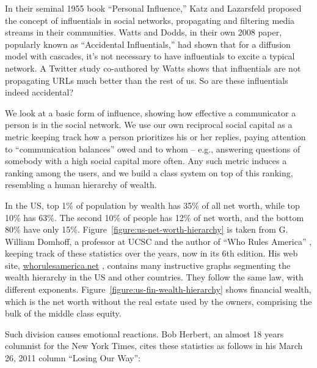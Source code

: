 \documentclass[10pt,oneside]{memoir}
\begin{document}
\begin{Spacing}{2}
In their seminal 1955 book ``Personal Influence,'' Katz and Lazarsfeld \cite{katz1955influence} proposed the concept of influentials in social networks, propagating and filtering media streams in their communities.  Watts and Dodds, in their own 2008 paper, popularly known as ``Accidental Influentials,'' had shown that for a diffusion model with cascades, it's not necessary to have influentials to excite a typical network.  A Twitter study co-authored by Watts shows that influentials are not propagating URLs much better than the rest of us.  So are these influentials indeed accidental?


We look at a basic form of influence, showing how effective a communicator a person is in the social network.  We use our own reciprocal social capital as a metric keeping track how a person prioritizes his or her replies, paying attention to ``communication balances'' owed and to whom -- e.g., answering questions of somebody with a high social capital more often.  Any such metric induces a ranking among the users, and we build a class system on top of this ranking, resembling a human hierarchy of wealth.


In the US, top 1\% of population by wealth has 35\% of all net worth, while top 10\% has 63\%.  The second 10\% of people has 12\% of net worth, and the bottom 80\% have only 15\%.  Figure~\ref{figure:us-net-worth-hierarchy} is taken from  G. William Domhoff, a professor at UCSC and the author of ``Who Rules America'' \cite{domhoff2006rules}, keeping track of these statistics over the years, now in its 6th edition.  His web site, \url{whorulesamerica.net} \cite{domhoff2011whorules}, contains many instructive graphs segmenting the wealth hierarchy in the US and other countries.  They follow the same law, with different exponents.  Figure~\ref{figure:us-fin-wealth-hierarchy} shows financial wealth, which is the net worth without the real estate used by the owners, comprising the bulk of the middle class equity.


Such division causes emotional reactions.  Bob Herbert, an almost 18 years columnist for the New York Times, cites these statistics as follows in his March 26, 2011 column ``Losing Our Way'':



\end{Spacing}
\end{document}
